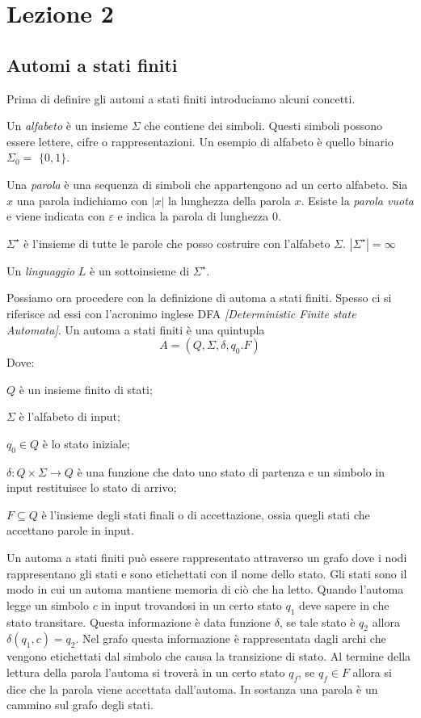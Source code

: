 
\section{Lezione 2}
\subsection{Automi a stati finiti}
Prima di definire gli automi a stati finiti introduciamo alcuni concetti.
\begin{description}
	\item Un \emph{alfabeto} \`e un insieme $\Sigma$ che contiene dei simboli. Questi simboli possono essere lettere, cifre o rappresentazioni. Un esempio di alfabeto \`e quello binario $\Sigma_0 =$ $\{0, 1\}$.
	\item Una \emph{parola} \`e una sequenza di simboli che appartengono ad un certo alfabeto. Sia $x$ una parola indichiamo con $|x|$ la lunghezza della parola $x$. Esiste la \emph{parola vuota} e viene indicata con $\varepsilon$ e indica la parola di lunghezza $0$.
	\item $\Sigma^{\star}$ \`e l'insieme di tutte le parole che posso costruire con l'alfabeto $\Sigma$. $|\Sigma^{\star}| = \infty$
	\item Un \emph{linguaggio} $L$ \`e un sottoinsieme di $\Sigma^{\star}$.
\end{description}
Possiamo ora procedere con la definizione di automa a stati finiti. Spesso ci si riferisce ad essi con l'acronimo inglese DFA \emph{[Deterministic Finite state Automata]}. Un automa a stati finiti \`e una quintupla 
\[
	A = (Q, \Sigma, \delta, q_0. F)
\]
Dove:
\begin{description}
	\item $Q$ \`e un insieme finito di stati;
	\item $\Sigma$ \`e l'alfabeto di input;
	\item $q_0 \in Q$ \`e lo stato iniziale;
	\item $\delta : Q \times \Sigma \to Q$ \`e una funzione che dato uno stato di partenza e un simbolo in input restituisce lo stato di arrivo;
	\item $F \subseteq Q$ \`e l'insieme degli stati finali o di accettazione, ossia quegli stati che accettano parole in input.	 
\end{description}
Un automa a stati finiti pu\`o essere rappresentato attraverso un grafo dove i nodi rappresentano gli stati e sono etichettati con il nome dello stato. Gli stati sono il modo in cui un automa mantiene memoria di ci\`o che ha letto. Quando l'automa legge un simbolo $c$ in input trovandosi in un certo stato $q_1$ deve sapere in che stato transitare. Questa informazione \`e data funzione $\delta$, se tale stato \`e $q_2$ allora $\delta(q_1, c) = q_2$. Nel grafo questa informazione \`e rappresentata dagli archi che vengono etichettati dal simbolo che causa la transizione di stato. Al termine della lettura della parola l'automa si trover\`a in un certo stato $q_f$, se $q_f \in F$ allora si dice che la parola viene accettata dall'automa. In sostanza una parola \`e un cammino sul grafo degli stati. \\
